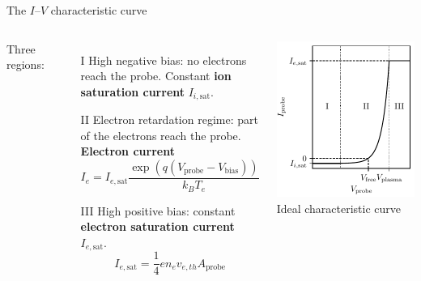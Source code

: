 \documentclass[10pt]{beamer}
\newcommand{\electronsaturationcurrent}[0]{\ensuremath{I_{e,{\mathrm{sat}}}}}
\newcommand{\biasvoltage}{\ensuremath{V_{\mathrm{bias}}}}
\newcommand{\probevoltage}{\ensuremath{V_{\mathrm{probe}}}}
\begin{document}
\begin{frame}{The $I$--$V$ characteristic curve}
    \begin{columns}
        Three regions:
        \begin{enumerate}
            \item[I] High negative bias: no electrons reach the probe. Constant \textbf{ion saturation current} $I_{i,\mathrm{sat}}$.
            \item[II] Electron retardation regime: part of the electrons reach the probe. \textbf{Electron current}\, 
            \begin{equation*}
                I_e = \electronsaturationcurrent \frac{\exp({q(\probevoltage - \biasvoltage)})}{k_B T_e}
            \end{equation*}
            \item[III] High positive bias: constant \textbf{electron saturation current} $\electronsaturationcurrent$.
            \begin{equation*}
                \electronsaturationcurrent = \frac{1}{4}e n_e v_{e,th} A_{\mathrm{probe}}
            \end{equation*}
        \end{enumerate}
        \centering
        \includegraphics[scale=1]{../figures/langmuir_characteristic.pdf}
        \small Ideal characteristic curve
    \end{columns}
\end{frame}
\end{document}
